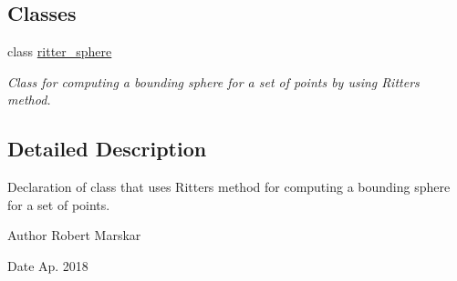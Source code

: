 \subsection*{Classes}
\begin{DoxyCompactItemize}
\item 
class \hyperlink{classritter__sphere}{ritter\+\_\+sphere}
\begin{DoxyCompactList}\small\item\em Class for computing a bounding sphere for a set of points by using Ritter\textquotesingle{}s method. \end{DoxyCompactList}\end{DoxyCompactItemize}


\subsection{Detailed Description}
Declaration of class that uses Ritter\textquotesingle{}s method for computing a bounding sphere for a set of points. 

\begin{DoxyAuthor}{Author}
Robert Marskar 
\end{DoxyAuthor}
\begin{DoxyDate}{Date}
Ap. 2018 
\end{DoxyDate}
